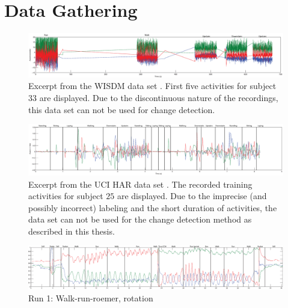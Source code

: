 \section{Data Gathering}\label{sec:data_gathering}



\begin{figure}\label{fig:wisdm_excerpt}
\centering
  \includegraphics[width=1\textwidth]{./Figures/Chapter6/data_collection/wisdm_excerpt.eps}
  \caption[WISDM Excerpt]{Excerpt from the WISDM data set \cite{kwapisz2011activity}. First five activities for subject $33$ are displayed. Due to the discontinuous nature of the recordings, this data set can not be used for change detection.}
\end{figure}

\begin{figure}\label{fig:uci_annotated}
\centering
  \includegraphics[width=1\textwidth]{./Figures/Chapter6/data_collection/uci_annotated.eps}
  \caption[UCI HAR Excerpt]{Excerpt from the UCI HAR data set \cite{anguita2012human}. The recorded training activities for subject $25$ are displayed. Due to the imprecise (and possibly incorrect) labeling and the short duration of activities, the data set can not be used for the change detection method as described in this thesis.}
\end{figure}

\begin{figure}
\centering
  \includegraphics[width=1\textwidth]{./Figures/chapter6/data_collection/run-1-walk-run-roemer/data_plot_rot_annotated.eps}
  \caption[R1: rotation]{Run 1: Walk-run-roemer, rotation}
\end{figure}

